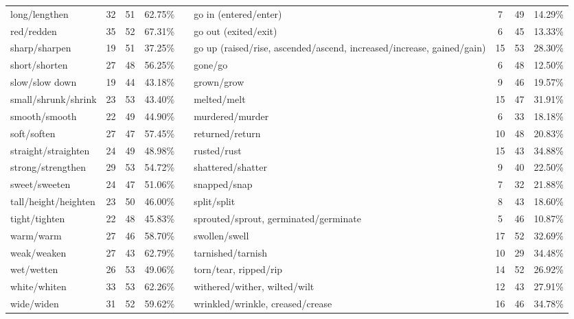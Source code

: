\begin{tabular}{p{3cm}ccccp{3cm}ccc}
long/lengthen & 32 & 51 & 62.75\% & & go in (entered/enter) & 7 & 49 & 14.29\% \\
red/redden & 35 & 52 & 67.31\% & & go out (exited/exit) & 6 & 45 & 13.33\% \\
sharp/sharpen & 19 & 51 & 37.25\% & & go up (raised/rise, ascended/ascend, increased/increase, gained/gain) & 15 & 53 & 28.30\% \\
short/shorten & 27 & 48 & 56.25\% & & gone/go & 6 & 48 & 12.50\% \\
slow/slow down & 19 & 44 & 43.18\% & & grown/grow & 9 & 46 & 19.57\% \\
small/shrunk/shrink & 23 & 53 & 43.40\% & & melted/melt & 15 & 47 & 31.91\% \\
smooth/smooth & 22 & 49 & 44.90\% & & murdered/murder & 6 & 33 & 18.18\% \\
soft/soften & 27 & 47 & 57.45\% & & returned/return & 10 & 48 & 20.83\% \\
straight/straighten & 24 & 49 & 48.98\% & & rusted/rust & 15 & 43 & 34.88\% \\
strong/strengthen & 29 & 53 & 54.72\% & & shattered/shatter & 9 & 40 & 22.50\% \\
sweet/sweeten & 24 & 47 & 51.06\% & & snapped/snap & 7 & 32 & 21.88\% \\
tall/height/heighten & 23 & 50 & 46.00\% & & split/split & 8 & 43 & 18.60\% \\
tight/tighten & 22 & 48 & 45.83\% & & sprouted/sprout, germinated/germinate & 5 & 46 & 10.87\% \\
warm/warm & 27 & 46 & 58.70\% & & swollen/swell & 17 & 52 & 32.69\% \\
weak/weaken & 27 & 43 & 62.79\% & & tarnished/tarnish & 10 & 29 & 34.48\% \\
wet/wetten & 26 & 53 & 49.06\% & & torn/tear, ripped/rip & 14 & 52 & 26.92\% \\
white/whiten & 33 & 53 & 62.26\% & & withered/wither, wilted/wilt & 12 & 43 & 27.91\% \\
wide/widen & 31 & 52 & 59.62\% & & wrinkled/wrinkle, creased/crease & 16 & 46 & 34.78\%
\end{tabular}